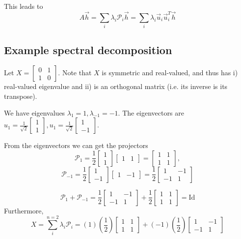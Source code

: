 \documentclass[12pt]{article}
\newcommand{\Proj}{\mathcal{P}}
\theoremstyle{definition}
\theoremstyle{remark}
\begin{document}
This leads to $$A\vec{h}=\sum_i\lambda_i\Proj_i\vec{h}=\sum_i\lambda_i\vec{u}_i\vec{u}_i^T\vec{h}$$

\subsection{Example spectral decomposition}
Let $X=\begin{bmatrix} 0 & 1 \\ 1 & 0 \end{bmatrix}$. Note that $X$ is symmetric and real-valued, and thus has i) real-valued eigenvalue and ii) is an orthogonal matrix (i.e. its inverse is its transpose).

We have eigenvalues $\lambda_{1}=1, \lambda_{-1}=-1$. The eigenvectors are $u_{1}=\frac{1}{\sqrt{2}}\begin{bmatrix} 1 \\ 1\end{bmatrix} , u_{1}=\frac{1}{\sqrt{2}}\begin{bmatrix} 1 \\ -1\end{bmatrix}$.

    From the eigenvectors we can get the projectors
    $$\Proj_{1}=\frac{1}{2}\begin{bmatrix} 1 \\ 1 \end{bmatrix}\begin{bmatrix} 1 & 1 \end{bmatrix}=
    \begin{bmatrix}
       1 & 1 \\ 1 & 1 
    \end{bmatrix},$$
    $$\Proj_{-1}=\frac{1}{2}\begin{bmatrix} 1 \\ -1 \end{bmatrix}\begin{bmatrix} 1 & -1 \end{bmatrix}=
 \frac{1}{2}   \begin{bmatrix}
       1 & -1 \\ -1 & 1 
    \end{bmatrix}$$

    $$\Proj_{1}+\Proj_{-1}=
    \frac{1}{2}\begin{bmatrix}
       1 & -1 \\ -1 & 1 
    \end{bmatrix} + 
    \frac{1}{2}\begin{bmatrix}
       1 & 1 \\ 1 & 1 
    \end{bmatrix} = \text{Id}
    $$
    Furthermore, $$X=\sum_i^{n=2}\lambda_i\Proj_i=(1)
    \left(\frac{1}{2}\right)\begin{bmatrix}
       1 & 1 \\ 1 & 1 
    \end{bmatrix} +
    (-1)
    \left(\frac{1}{2}\right)\begin{bmatrix}
       1 & -1 \\ -1 & 1 
    \end{bmatrix} $$ 
\end{document}
